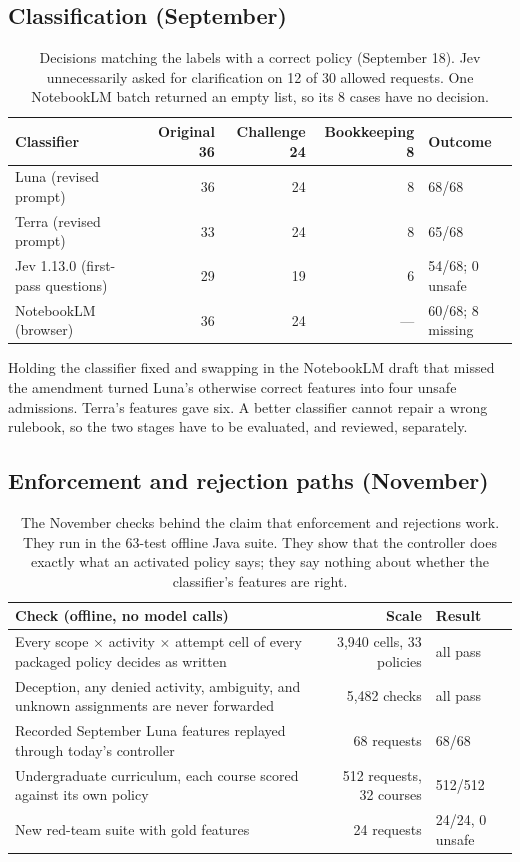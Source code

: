 \documentclass[11pt,letterpaper]{article}
\begin{document}
\subsection{Classification (September)}

\begin{table}[H]
\centering\small
\begin{tabular}{lrrrl}
\toprule
Classifier & Original 36 & Challenge 24 & Bookkeeping 8 & Outcome \\
\midrule
Luna (revised prompt) & 36 & 24 & 8 & 68/68 \\
Terra (revised prompt) & 33 & 24 & 8 & 65/68 \\
Jev 1.13.0 (first-pass questions) & 29 & 19 & 6 & 54/68; 0 unsafe \\
NotebookLM (browser) & 36 & 24 & --- & 60/68; 8 missing \\
\bottomrule
\end{tabular}
\caption{Decisions matching the labels with a correct policy (September 18). Jev unnecessarily asked for clarification on 12 of 30 allowed requests. One NotebookLM batch returned an empty list, so its 8 cases have no decision.}
\label{tab:sept}
\end{table}

Holding the classifier fixed and swapping in the NotebookLM draft that missed the amendment turned Luna's otherwise correct features into four unsafe admissions. Terra's features gave six. A better classifier cannot repair a wrong rulebook, so the two stages have to be evaluated, and reviewed, separately.

\subsection{Enforcement and rejection paths (November)}

\begin{table}[H]
\centering\small
\begin{tabular}{p{6.1cm}rl}
\toprule
Check (offline, no model calls) & Scale & Result \\
\midrule
Every scope $\times$ activity $\times$ attempt cell of every packaged policy decides as written & 3,940 cells, 33 policies & all pass \\
Deception, any denied activity, ambiguity, and unknown assignments are never forwarded & 5,482 checks & all pass \\
Recorded September Luna features replayed through today's controller & 68 requests & 68/68 \\
Undergraduate curriculum, each course scored against its own policy & 512 requests, 32 courses & 512/512 \\
New red-team suite with gold features & 24 requests & 24/24, 0 unsafe \\
\bottomrule
\end{tabular}
\caption{The November checks behind the claim that enforcement and rejections work. They run in the 63-test offline Java suite. They show that the controller does exactly what an activated policy says; they say nothing about whether the classifier's features are right.}
\label{tab:controller}
\end{table}
\end{document}
